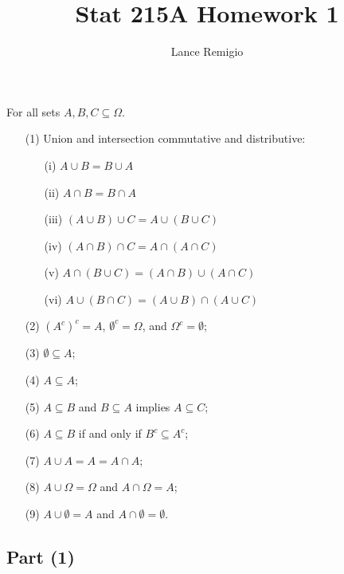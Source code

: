 \documentclass[a4paper]{article}
\title{Stat 215A Homework 1}
\author{Lance Remigio}
\begin{document}
\maketitle   

\rhead{\thepage}
\begin{prop}[A.1.1]
   For all sets \( A, B , C \subseteq \Omega \). 
   \begin{enumerate}
        \item[(1)] Union and intersection commutative and distributive:
            \begin{enumerate}
                \item[(i)] \( A \cup B   = B \cup A \) 
                \item[(ii)] \( A \cap B = B \cap A  \)
                \item[(iii)] \( (A \cup B) \cup C  = A \cup (B \cup C) \)
                \item[(iv)] \( (A \cap B) \cap C  = A \cap (A \cap C) \)
                \item[(v)] \( A \cap (B \cup C ) = (A \cap B) \cup (A \cap C) \)
                \item[(vi)] \( A \cup (B \cap C) = (A \cup B) \cap (A \cup C) \)
            \end{enumerate}
        \item[(2)] \( (A^{c})^{c} = A  \), \( \emptyset^{c} = \Omega\), and \( \Omega^{c} = \emptyset \);
        \item[(3)] \( \emptyset \subseteq  A  \);
        \item[(4)] \( A \subseteq  A  \);
        \item[(5)] \( A \subseteq  B   \) and \( B \subseteq A  \) implies \( A \subseteq  C  \);
        \item[(6)] \( A \subseteq  B  \) if and only if \( B^{c} \subseteq  A^{c} \);
        \item[(7)] \( A \cup A = A = A \cap A  \);
        \item[(8)] \( A \cup \Omega = \Omega \) and \( A \cap \Omega = A  \);
        \item[(9)] \( A \cup \emptyset = A  \) and \( A \cap \emptyset = \emptyset \).
   \end{enumerate}
\end{prop}

\subsection*{Part (1)}
\end{document}
